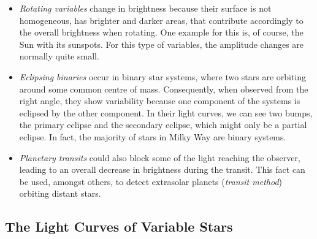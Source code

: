 \begin{itemize}
\item \emph{Rotating variables} change in brightness because their surface is not homogeneous, \eg has brighter and darker areas, that contribute accordingly to the overall brightness when rotating. One example for this is, of course, the Sun with its sunspots. For this type of variables, the amplitude changes are normally quite small.
\item \emph{Eclipsing binaries} occur in binary star systems, where two stars are orbiting around some common centre of mass. Consequently, when observed from the right angle, they show variability because one component of the systems is eclipsed by the other component. In their light curves, we can see two bumps, the primary eclipse and the secondary eclipse, which might only be a partial eclipse. In fact, the majority of stars in Milky Way are binary systems.
\item \emph{Planetary transits} could also block some of the light reaching the observer, leading to an overall decrease in brightness during the transit. This fact can be used, amongst others, to detect extrasolar planets (\emph{transit method}) orbiting distant stars.
\end{itemize}

\subsection{The Light Curves of Variable Stars}
\label{subsec:light-curves-variables}

